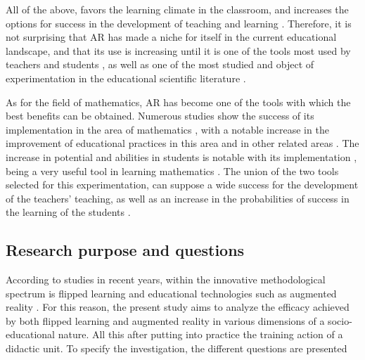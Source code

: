 \documentclass{textolivre}
\begin{document}
All of the above, favors the learning climate in the classroom, and increases the options for success in the development of teaching and learning \cite{prendes2015}. Therefore, it is not surprising that AR has made a niche for itself in the current educational landscape, and that its use is increasing until it is one of the tools most used by teachers and students \cite{rodriguez2019}, as well as one of the most studied and object of experimentation in the educational scientific literature \cite{campos2019}. %

As for the field of mathematics, AR has become one of the tools with which the best benefits can be obtained. Numerous studies show the success of its implementation in the area of mathematics \cite{garzon2019}, with a notable increase in the improvement of educational practices in this area and in other related areas \cite{bower2014}. The increase in potential and abilities in students is notable with its implementation \cite{cai2019}, being a very useful tool in learning mathematics \cite{cahyono2020}. The union of the two tools selected for this experimentation, can suppose a wide success for the development of the teachers' teaching, as well as an increase in the probabilities of success in the learning of the students \cite{lopezbelmonte+pozosanchez+fuentescabrera+romero2020}.

\subsection{Research purpose and questions}
According to studies in recent years, within the innovative methodological spectrum is flipped learning \cite{morenoguerrero+romerorodriguez+lopezbelmonte+alonsogarcia2020, parragonzalez-lopezbelmonte-segurarobles2020} and educational technologies such as augmented reality \cite{cabero2019, lopezbelmonte+pozosanchez+fuentescabrera+parragonzalez2019}. %
For this reason, the present study aims to analyze the efficacy achieved by both flipped learning and augmented reality in various dimensions of a socio-educational nature. All this after putting into practice the training action of a didactic unit. To specify the investigation, the different questions are presented
\end{document}
